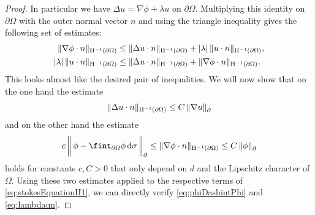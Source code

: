 \begin{proof}
  In particular we have $\Delta u = \nabla \phi + \lambda u$  on $\partial\Omega$.
  Multiplying this identity  on $\partial\Omega$ with the outer normal vector $n$ and using the triangle inequality gives the following set of estimates:
  \begin{align}
    \label{eq:stokesEquationH1}
    \begin{alignedat}{1}
    \|\nabla \phi \cdot n\|_{\mathrm{H}^{-1}(\partial\Omega)} 
    &\leq \|\Delta u \cdot n \|_{\mathrm{H}^{-1}(\partial\Omega)} + |\lambda|\, \| u\cdot n\|_{\mathrm{H}^{-1}(\partial\Omega)}, \\
    |\lambda|\, \| u\cdot n \|_{\mathrm{H}^{-1}(\partial\Omega)} 
    &\leq \|\Delta u \cdot n \|_{\mathrm{H}^{-1}(\partial\Omega)} + \|\nabla \phi \cdot n \|_{\mathrm{H}^{-1}(\partial\Omega)}.
    \end{alignedat}
  \end{align}
  This looks almost like the desired pair of inequalities.
  We will now show that on the one hand the estimate
  \begin{align}
    \label{eq:deltaun}
    \|\Delta u \cdot n\|_{\mathrm{H}^{-1}(\partial\Omega)}
    \leq C\, \|\nabla u\|^{}_\partial
  \end{align}
  and on the other hand the estimate
  \begin{align}
    \label{eq:nablaPhin}
    c \, \bigg\|\,\phi - \fint_{\partial\Omega} \phi \d\sigma  \, \bigg\|^{}_\partial 
    \leq \|\nabla \phi \cdot n\|_{\HH^{-1}(\partial\Omega)}
    \leq C\,  \|\phi\|^{}_\partial
  \end{align}
  holds for constants $c, C > 0$ that only depend on $d$ and the Lipschitz character of $\Omega$.
  Using these two estimates applied to the respective terms of \eqref{eq:stokesEquationH1}, we can directly verify \eqref{eq:phiDashintPhi} and \eqref{eq:lambdaun}.


\end{proof}
